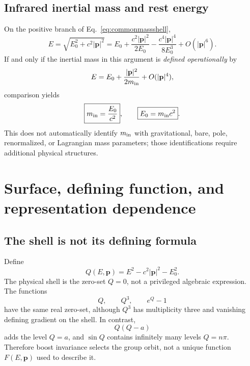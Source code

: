 \documentclass[11pt,a4paper]{article}
\begin{document}
\subsection{Infrared inertial mass and rest energy}
On the positive branch of Eq.~\eqref{eq:commonmassshell},
\begin{equation}
E=\sqrt{E_0^2+c^2|\mathbf p|^2}
=E_0+\frac{c^2|\mathbf p|^2}{2E_0}
-\frac{c^4|\mathbf p|^4}{8E_0^3}+O(|\mathbf p|^6).
\label{eq:massshellexpansion}
\end{equation}
If and only if the inertial mass in this argument is \emph{defined operationally} by
\begin{equation}
E=E_0+\frac{|\mathbf p|^2}{2m_{\rm in}}+O(|\mathbf p|^4),
\end{equation}
comparison yields
\begin{equation}
\boxed{m_{\rm in}=\frac{E_0}{c^2}},
\qquad
\boxed{E_0=m_{\rm in}c^2}.
\label{eq:massshellmc2}
\end{equation}
This does not automatically identify $m_{\rm in}$ with gravitational, bare, pole, renormalized, or Lagrangian mass parameters; those identifications require additional physical structures.

\section{Surface, defining function, and representation dependence}
\subsection{The shell is not its defining formula}
Define
\begin{equation}
Q(E,\mathbf p)=E^2-c^2|\mathbf p|^2-E_0^2.
\end{equation}
The physical shell is the zero-set $Q=0$, not a privileged algebraic expression.  The functions
\begin{equation}
Q,
\qquad Q^3,
\qquad e^Q-1
\end{equation}
have the same real zero-set, although $Q^3$ has multiplicity three and vanishing defining gradient on the shell.  In contrast,
\begin{equation}
Q(Q-a)
\end{equation}
adds the level $Q=a$, and $\sin Q$ contains infinitely many levels $Q=n\pi$.  Therefore boost invariance selects the group orbit, not a unique function $F(E,\mathbf p)$ used to describe it.
\end{document}
